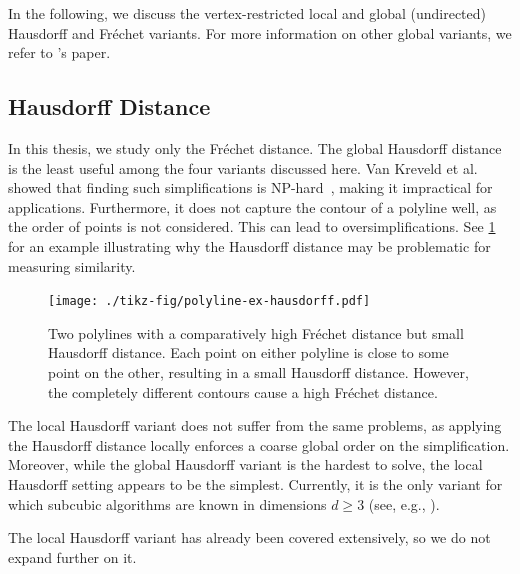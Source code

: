 In the following, we discuss the vertex-restricted local and global (undirected) Hausdorff and Fréchet variants. For more information on other global variants, we refer to \citeauthor{global_curve_simplification}'s paper.

\subsection{Hausdorff Distance}
In this thesis, we study only the Fréchet distance. The global Hausdorff distance is the least useful among the four variants discussed here. Van Kreveld et al. showed that finding such simplifications is NP-hard~\cite{on_optimal_polyline_simplification_using_the_hausdorff_and_frechet_distance}, making it impractical for applications. Furthermore, it does not capture the contour of a polyline well, as the order of points is not considered. This can lead to oversimplifications. See \cref{fig:polyline-ex-hausdorff} for an example illustrating why the Hausdorff distance may be problematic for measuring similarity.

\begin{figure}[b]
  \centering
  \texttt{[image: ./tikz-fig/polyline-ex-hausdorff.pdf]}
  \caption{Two polylines with a comparatively high Fréchet distance but small Hausdorff distance. Each point on either polyline is close to some point on the other, resulting in a small Hausdorff distance. However, the completely different contours cause a high Fréchet distance.}
  \label{fig:polyline-ex-hausdorff}
\end{figure}

The local Hausdorff variant does not suffer from the same problems, as applying the Hausdorff distance locally enforces a coarse global order on the simplification. Moreover, while the global Hausdorff variant is the hardest to solve, the local Hausdorff setting appears to be the simplest. Currently, it is the only variant for which subcubic algorithms are known in dimensions \(d \geq 3\) (see, e.g., \cite{efficiently_approximating_higher_dim}).

The local Hausdorff variant has already been covered extensively, so we do not expand further on it.

